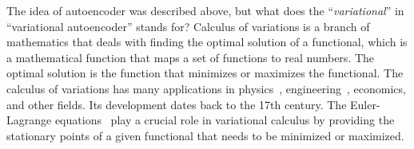 

The idea of autoencoder was described above, but what does the ``\textit{variational}'' in ``variational autoencoder'' stands for? 
Calculus of variations is a branch of mathematics that deals with finding the optimal solution of a functional, which is a mathematical 
function that maps a set of functions to real numbers. The optimal solution is the function that minimizes or maximizes the functional. 
The calculus of variations has many applications in physics~\cite{lagrangian-mechanics-1998}, engineering~\cite{optimal-control-2004}, economics, and other fields.
Its development dates back to the 17th century. The Euler-Lagrange equations~\cite{intro-variational-calc-2003} play a crucial role in variational 
calculus by providing the stationary points of a given functional that needs to be minimized or maximized.

